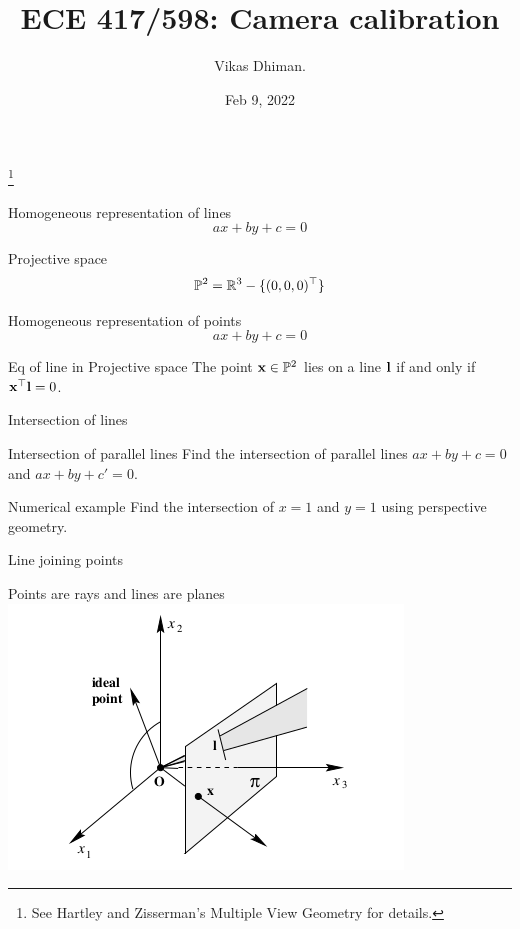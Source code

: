 \documentclass[times,t]{beamer}
\title{ECE 417/598: Camera calibration}
\author{Vikas Dhiman.  }
\date{Feb 9, 2022}
\begin{document}
\begin{frame}
  \titlepage
  \footnote{See Hartley  and Zisserman's Multiple   View  Geometry for  details.}
  \end{frame}

  
  \begin{frame}{Homogeneous representation of lines}
    \[ ax + by + c = 0\]
  \end{frame}

  \begin{frame}{Projective space}
    \[ \mathbb{P}^2 = \mathbb{R}^3 - \{  (0, 0, 0)^\top \}   \]
    \end{frame}

    \begin{frame}{Homogeneous representation of points}
      \[ ax + by + c = 0\]
    \end{frame}

\begin{frame}{Eq of line in Projective space}
      The point $\mathbf{x} \in \mathbb{P}^2$ lies on a line $\mathbf{l}$ if and only if
      $\mathbf{x}^\top \mathbf{l} = 0$.
\end{frame}

\begin{frame}{Intersection of lines}
\end{frame}


\begin{frame}{Intersection  of  parallel  lines}
  Find   the  intersection  of  parallel lines  $ax+by+c =  0$  and  $ax+by+c'=0$.
\end{frame}

\begin{frame}{Numerical example}
  Find   the  intersection  of  $x =  1$  and  $y=1$ using  perspective  geometry.
\end{frame}

\begin{frame}{Line joining  points}
\end{frame}

\begin{frame}{Points are rays and  lines are  planes}
  \includegraphics[width=\linewidth]{media/projective-plane-points-are-rays-and-lines-are-planes.png}
\end{frame}
\end{document}
